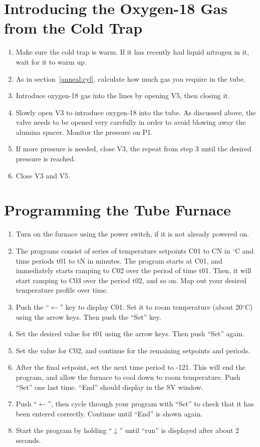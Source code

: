 \documentclass{thesis-umich}
\begin{document}
\section{Introducing the Oxygen-18 Gas from the Cold Trap}
\begin{enumerate}
	\item Make sure the cold trap is warm. If it has recently had liquid nitrogen in it, wait for it to warm up.
	\item As in section~\ref{anneal:cyl}, calculate how much gas you require in the tube.
	\item Introduce oxygen-18 gas into the lines by opening V5, then closing it.
	\item Slowly open V3 to introduce oxygen-18 into the tube. As discussed above, the valve needs to be opened very carefully in order to avoid blowing away the alumina spacer. Monitor the pressure on P1.
	\item If more pressure is needed, close V3, the repeat from step 3 until the desired pressure is reached.
	\item Close V3 and V5.
\end{enumerate}

\section{Programming the Tube Furnace}
\begin{enumerate}
	\item Turn on the furnace using the power switch, if it is not already powered on.
	\item The programs consist of series of temperature setpoints C01 to CN in $^\circ$C and time periods t01 to tN in minutes. The program starts at C01, and immediately starts ramping to C02 over the period of time t01. Then, it will start ramping to C03 over the period t02, and so on. Map out your desired temperature profile over time.
	\item Push the ``$\leftarrow$'' key to display C01. Set it to room temperature (about 20$^\circ$C) using the arrow keys. Then push the ``Set'' key.
	\item Set the desired value for t01 using the arrow keys. Then push ``Set'' again.
	\item Set the value for C02, and continue for the remaining setpoints and periods.
	\item After the final setpoint, set the next time period to -121. This will end the program, and allow the furnace to cool down to room temperature. Push ``Set'' one last time. ``End'' should display in the SV window.
	\item Push ``$\leftarrow$'', then cycle through your program with ``Set'' to check that it has been entered correctly. Continue until ``End'' is shown again.
	\item Start the program by holding ``$\downarrow$'' until ``run'' is displayed after about 2 seconds.
\end{enumerate}
\end{document}
